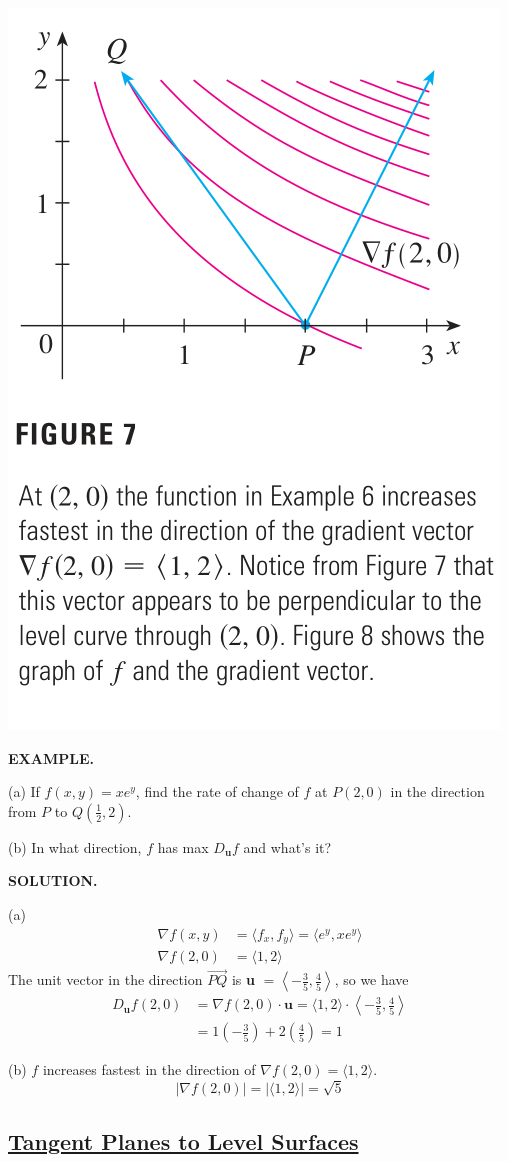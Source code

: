 \documentclass{article}
\begin{document}
\begin{minipage}[]{0.3\linewidth}
  \includegraphics[width = 4.3 cm]{./images/maxeg6.png}
  
\end{minipage}
\begin{minipage}[]{0.67\linewidth}
  {\selectfont \textbf{\textcolor{blue5}{ EXAMPLE.}}} 

  (a) If $f(x,y) = xe^y $, find the rate of change of $f$ at $P(2,0)$ in the direction from $P$ to $Q(\frac{1}{2}, 2 )$.

  (b) In what direction, $f$ has max $D _ \textbf{u} f$ and what's it?

  {\selectfont \textbf{\textcolor{blue5}{SOLUTION.}}} 

  (a) \begin{align*}
    \nabla f(x,y) & = \langle f_x, f_y  \rangle = \langle e^y, xe^y  \rangle \\
    \nabla f(2,0) & = \langle 1,2  \rangle
  \end{align*}
  The unit vector in the direction $\overrightarrow{PQ}$ is \textbf{u} $= \left< -\frac{3 }{5 }, \frac{4 }{5 }  \right>$, so we have 
  \begin{align*}
    D _ \textbf{u} f(2,0) & = \nabla f(2,0) \cdot \textbf{u} = \langle 1,2 \rangle \cdot  \left< -\frac{3 }{5 }, \frac{4 }{5 }  \right>  \\
    & = 1 \left( - \frac{3 }{5 } \right) + 2 \left( \frac{4 }{ 5 } \right) = 1
  \end{align*}

  (b) $f$ increases fastest in the direction of $\nabla f(2,0) = \langle 1, 2  \rangle$.
  \[|\nabla f(2,0)| = |\langle 1,2 \rangle  | = \sqrt{5 }\]
\end{minipage}

\subsection*{{\selectfont \textcolor{blue5}{ \underline{Tangent Planes to Level Surfaces}}}}
\end{document}
